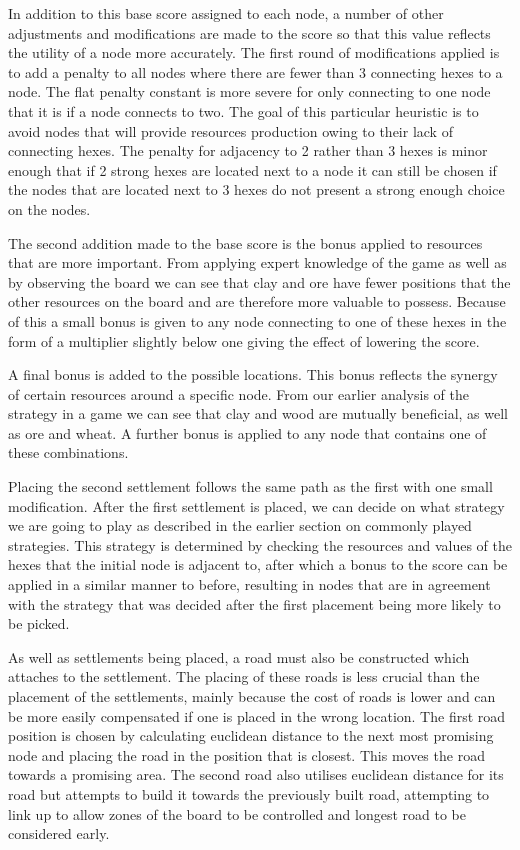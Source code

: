 \documentclass[]{article}
\begin{document}
\par In addition to this base score assigned to each node, a number of other adjustments and modifications are made to the score so that this value reflects the utility of a node more accurately. The first round of modifications applied is to add a penalty to all nodes where there are fewer than 3 connecting hexes to a node. The flat penalty constant is more severe for only connecting to one node that it is if a node connects to two. The goal of this particular heuristic is to avoid nodes that will provide resources production owing to their lack of connecting hexes. The penalty for adjacency to 2 rather than 3 hexes is minor enough that if 2 strong hexes are located next to a node it can still be chosen if the nodes that are located next to 3 hexes do not present a strong enough choice on the nodes.

\par The second addition made to the base score is the bonus applied to resources that are more important. From applying expert knowledge of the game as well as by observing the board we can see that clay and ore have fewer positions that the other resources on the board and are therefore more valuable to possess. Because of this a small bonus is given to any node connecting to one of these hexes in the form of a multiplier slightly below one giving the effect of lowering the score.


\par A final bonus is added to the possible locations. This bonus reflects the synergy of certain resources around a specific node. From our earlier analysis of the strategy in a game we can see that clay and wood are mutually beneficial, as well as ore and wheat. A further bonus is applied to any node that contains one of these combinations.

\par Placing the second settlement follows the same path as the first with one small modification. After the first settlement is placed, we can decide on what strategy we are going to play as described in the earlier section on commonly played strategies. This strategy is determined by checking the resources and values of the hexes that the initial node is adjacent to, after which a bonus to the score can be applied in a similar manner to before, resulting in nodes that are in agreement with the strategy that was decided after the first placement being more likely to be picked.

\par As well as settlements being placed, a road must also be constructed which attaches to the settlement. The placing of these roads is less crucial than the placement of the settlements, mainly because the cost of roads is lower and can be more easily compensated if one is placed in the wrong location. The first road position is chosen by calculating euclidean distance to the next most promising node and placing the road in the position that is closest. This moves the road towards a promising area. The second road also utilises euclidean distance for its road but attempts to build it towards the previously built road, attempting to link up to allow zones of the board to be controlled and longest road to be considered early.
\end{document}
